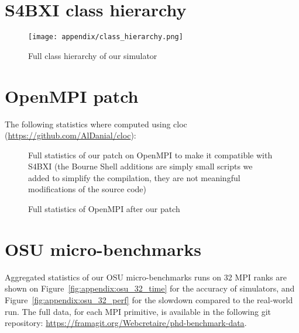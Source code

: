 \chapter{S4BXI class hierarchy}
\label{app:s4bxi_class_hierarchy}

\vspace{-10mm}

\begin{figure}[!ht]
    \centering
    \texttt{[image: appendix/class\_hierarchy.png]}
    \caption{Full class hierarchy of our simulator}
    \label{fig:appendix:s4bxi_class_hierarchy}
\end{figure}

\makeatletter
\@openrightfalse
\makeatother

\chapter{OpenMPI patch}
\label{app:ompi_patch}

The following statistics where computed using cloc (\url{https://github.com/AlDanial/cloc}):

\begin{figure}[!ht]
    
    \caption{Full statistics of our patch on OpenMPI to make it compatible with S4BXI (the Bourne Shell additions are simply small scripts we added to simplify the compilation, they are not meaningful modifications of the source code)}
    \label{fig:appendix:cloc_diff_ompi}
\end{figure}

\begin{figure}[!ht]
    
    \caption{Full statistics of OpenMPI after our patch}
    \label{fig:appendix:cloc_total_ompi}
\end{figure}

\chapter{OSU micro-benchmarks}
\label{app:osu_32}

Aggregated statistics of our OSU micro-benchmarks runs on 32 MPI ranks are shown
on Figure~\ref{fig:appendix:osu_32_time} for the accuracy of simulators, and
Figure~\ref{fig:appendix:osu_32_perf} for the slowdown compared to the
real-world run. The full data, for each MPI primitive, is available in the
following git repository:
\href{https://framagit.org/Webcretaire/phd-benchmark-data/-/tree/master/5_high_level/OSU}{https://framagit.org/Webcretaire/phd-benchmark-data}.

